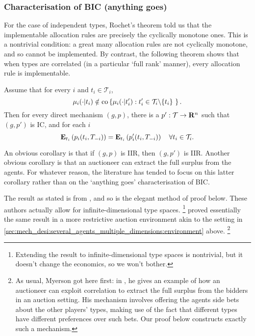 \documentclass[11pt,letterpaper,reqno,oneside]{article}
\begin{document}
\subsubsection{Characterisation of BIC (anything goes)}
\label{sec:mech_desi:several_agents_correlated_types:BIC}


For the case of independent types, Rochet's theorem told us that the implementable allocation rules are precisely the cyclically monotone ones. This is a nontrivial condition: a great many allocation rules are not cyclically monotone, and so cannot be implemented. By contrast, the following theorem shows that when types are correlated (in a particular `full rank' manner), every allocation rule is implementable.
%
\begin{theorem}
	\label{theorem:full_rent_extraction}
	Assume that for every $i$ and $t_i \in \mathcal{T}_i$,
	\begin{equation*}
		\mu_i(\cdot|t_i) \notin \operatorname*{co} \left\{ \mu_i(\cdot|t_i') :
		t_i' \in \mathcal{T}_i \backslash \{t_i\} \ \right\} .
	\end{equation*}
	Then for every direct mechanism $(g,p)$, there is a $p' : \mathcal{T} \to \mathbf{R}^n$ such that $(g,p')$ is IC, and for each $i$
	\begin{equation*}
		\mathbf{E}_{t_i}\left(
		p_i(t_i,T_{-i})
		\right)
		=
		\mathbf{E}_{t_i}\left(
		p_i'(t_i,T_{-i})
		\right)
		\quad\forall t_i \in \mathcal{T}_i .
	\end{equation*}
\end{theorem}

An obvious corollary is that if $(g,p)$ is IIR, then $(g,p')$ is IIR. Another obvious corollary is that an auctioneer can extract the full surplus from the agents. For whatever reason, the literature has tended to focus on this latter corollary rather than on the `anything goes' characterisation of BIC.

The result as stated is from \textcite{McafeeReny1992}, and so is the elegant method of proof below. These authors actually allow for infinite-dimensional type spaces.%
	\footnote{Extending the result to infinite-dimensional type spaces is nontrivial, but it doesn't change the economics, so we won't bother.}
\textcite{CremerMclean1988} proved essentially the same result in a more restrictive auction environment akin to the setting in \cref{sec:mech_desi:several_agents_multiple_dimensions:environment} above.%
	\footnote{As usual, Myerson got here first: in \textcite[][sec. 7]{Myerson1981}, he gives an example of how an auctioneer can exploit correlation to extract the full surplus from the bidders in an auction setting. His mechanism involves offering the agents side bets about the other players' types, making use of the fact that different types have different preferences over such bets. Our proof below constructs exactly such a mechanism.}
\end{document}
